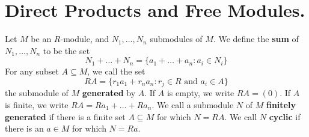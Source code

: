 \section{Direct Products and Free Modules.}

\begin{definition}
    Let $M$ be an  $R$-module, and $N_1, \dots, N_n$ submodules of $M$. We
    define the  \textbf{sum} of $N_1, \dots, N_n$ to be the set
    \begin{equation*}
        N_1+\dots+N_n=\{a_1+\dots+a_n : a_i \in N_i\}
    \end{equation*}
    For any subset $A \subseteq M$, we call the set
    \begin{equation*}
        RA=\{r_1a_1+r_na_n : r_j \in R \text{ and } a_i \in A\}
    \end{equation*}
    the submodule of $M$  \textbf{generated} by $A$. If $A$ is empty, we write
    $RA=(0)$. If $A$ is finite, we write  $RA=Ra_1+\dots+Ra_n$. We call a
    submodule $N$ of  $M$  \textbf{finitely generated} if there is a finite set
    $A \subseteq M$ for which  $N=RA$. We call  $N$  \textbf{cyclic} if there is
    an $a \in M$ for which  $N=Ra$.
\end{definition}

